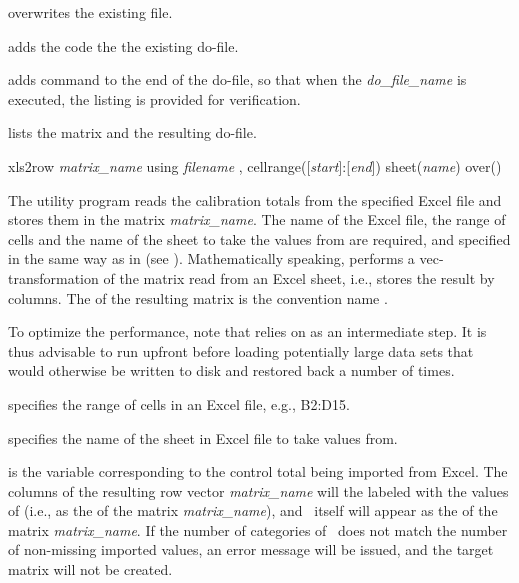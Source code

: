 \hangpara
{} overwrites the existing file.

\hangpara
{} adds the code the the existing do-file.

\hangpara
{} adds  command to the end of the do-file,
so that when the {\it do\_file\_name} is executed, the listing is provided
for verification.

\hangpara
{} lists the matrix and the resulting do-file.




\begin{stsyntax}
xls2row
{\it matrix\_name}
using
{\it filename}
,
cellrange([{\it start}]:[{\it end}])
sheet({\it name})
over(\varname)
\end{stsyntax}

The utility program  reads the calibration totals from
the specified Excel file and stores them in the matrix {\it matrix\_name}.
The name of the Excel file, the range of cells and the name of
the sheet to take the values from are required, and specified in the same
way as in  (see ).
Mathematically speaking,  performs a
vec-transformation of the matrix read from an Excel sheet, i.e., stores the result by columns.
The  of the resulting
    matrix is the convention name .

To optimize the performance, note that  relies on
 as an intermediate step. It is thus advisable to run
 upfront before loading potentially large data sets that
would otherwise be written to disk and restored back a number of times.


\hangpara
     specifies the range of cells in an Excel file, e.g., B2:D15.

\hangpara
     specifies the name of the sheet in Excel file to take values from.

\hangpara
     is the variable corresponding to the control total being
    imported from Excel. The columns of the resulting row vector {\it matrix\_name} will the
    labeled with the values of \varname (i.e., as the  
    of the matrix {\it matrix\_name}), and \varname\ itself will appear
    as the  of the matrix {\it matrix\_name}. If the number
    of categories of \varname\ does not match the number of non-missing imported
    values, an error message will be issued, and the target matrix will not be created.

